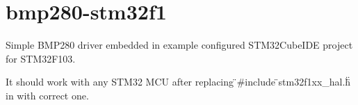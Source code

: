 \chapter{bmp280-\/stm32f1}
\hypertarget{index}{}\label{index}
\label{index_md__r_e_a_d_m_e}%
%


Simple BMP280 driver embedded in example configured STM32\+Cube\+IDE project for STM32\+F103.

It should work with any STM32 MCU after replacing \"{}\#include \"{}stm32f1xx\+\_\+hal.\+h\"{}\"{} in  with correct one. 